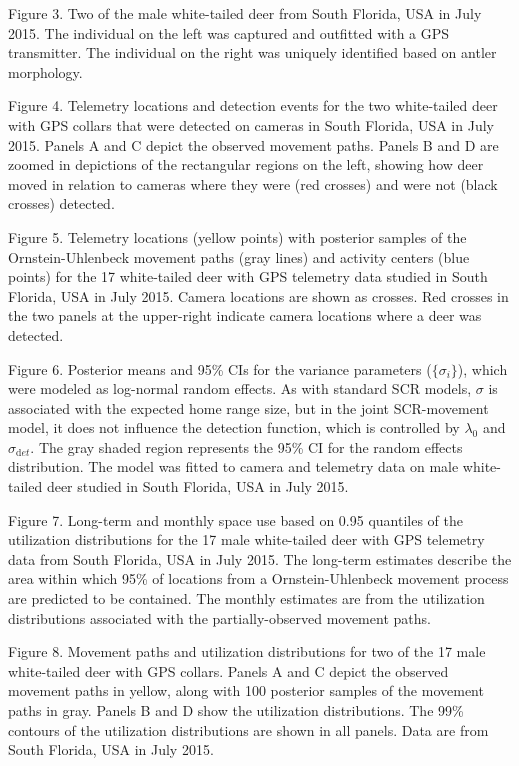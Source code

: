 \documentclass[12pt]{article}
\begin{document}
Figure 3. Two of the male white-tailed deer from South Florida, USA
    in July 2015. The individual on the left was captured and
    outfitted with a GPS transmitter. The individual on the right was
    uniquely identified based on antler morphology.
    
Figure 4. Telemetry locations and detection events for the two
    white-tailed deer with GPS collars that were detected on cameras
    in South Florida, USA in July 2015. Panels A and C depict
    the observed movement paths. Panels B and D are zoomed in
    depictions of the rectangular regions on the left, showing how
    deer moved in relation to cameras where they were (red crosses)
    and were not (black crosses) detected. 

Figure 5. Telemetry locations (yellow points) with posterior samples
    of the Ornstein-Uhlenbeck movement paths (gray lines) and activity
    centers (blue points) for the 17 white-tailed deer with GPS
    telemetry data studied in South Florida, USA in July 2015. Camera
    locations are shown as crosses. Red crosses in the two panels at the
    upper-right indicate camera locations where a deer was detected.     

\clearpage

Figure 6. Posterior means and 95\% CIs for the variance parameters
    ($\{\sigma_i\}$), which were modeled as log-normal random
    effects. As with standard SCR models, $\sigma$ is associated with
    the expected home range size, but in the joint SCR-movement model, it
    does not influence the detection function, which is controlled by
    $\lambda_0$ and $\sigma_{\mathrm  det}$. 
    The gray shaded region represents the 95\% CI for the random effects 
    distribution. The model was fitted to camera and telemetry data on
    male white-tailed deer studied in South Florida, USA in July 2015.

Figure 7. Long-term and monthly space use based
    on 0.95 quantiles of the utilization distributions for the 17
    male white-tailed deer with GPS telemetry data from South Florida,
    USA in July 2015. The long-term estimates describe the
    area within which 95\% of locations from a Ornstein-Uhlenbeck
    movement process are {predicted} to be contained. The
    monthly estimates are from the utilization distributions
    associated with the partially-observed movement paths. 

Figure 8. Movement paths and utilization distributions for two of the
    17 male white-tailed deer with GPS collars. Panels A and C depict the observed
    movement paths in yellow, along with 100 posterior samples of the
    movement paths in gray. Panels B and D show the
    utilization distributions. The 99\% contours of the utilization
    distributions are shown in all panels. Data are from South
    Florida, USA in July 2015.    
    
\end{document}
